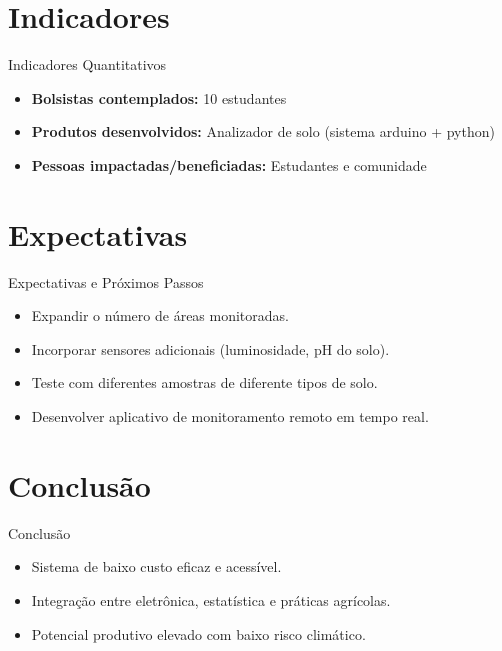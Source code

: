 \documentclass{beamer}
\begin{document}

\section{Indicadores}
\begin{frame}{Indicadores Quantitativos}
\begin{itemize}
    \item \textbf{Bolsistas contemplados:} 10 estudantes
    \item \textbf{Produtos desenvolvidos:} Analizador de solo (sistema arduino + python)
    \item \textbf{Pessoas impactadas/beneficiadas:} Estudantes e comunidade 
\end{itemize}
\end{frame}



\section{Expectativas}
\begin{frame}{Expectativas e Próximos Passos}
\begin{itemize}
    \item Expandir o número de áreas monitoradas.
    \item Incorporar sensores adicionais (luminosidade, pH do solo).
    \item Teste com diferentes amostras de diferente tipos de solo.
    \item Desenvolver aplicativo de monitoramento remoto em tempo real.
\end{itemize}
\end{frame}


\section{Conclusão}
\begin{frame}{Conclusão}
\begin{itemize}
    \item Sistema de baixo custo eficaz e acessível.
    \item Integração entre eletrônica, estatística e práticas agrícolas.
    \item Potencial produtivo elevado com baixo risco climático.
\end{itemize}
\end{frame}
\end{document}

